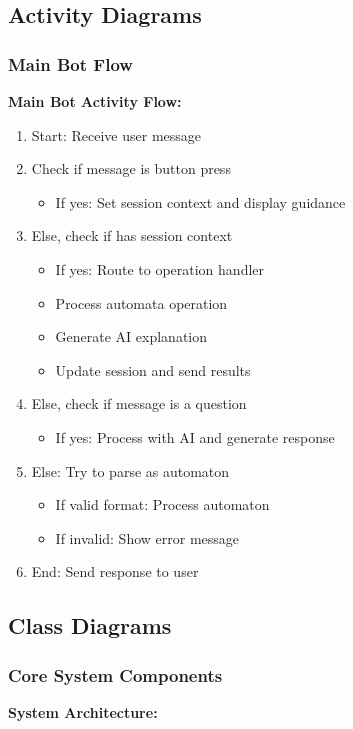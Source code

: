 \documentclass[12pt]{article}
\begin{document}
\subsection{Activity Diagrams}

\subsubsection{Main Bot Flow}
\textbf{Main Bot Activity Flow:}
\begin{enumerate}
    \item Start: Receive user message
    \item Check if message is button press
    \begin{itemize}
        \item If yes: Set session context and display guidance
    \end{itemize}
    \item Else, check if has session context
    \begin{itemize}
        \item If yes: Route to operation handler
        \item Process automata operation
        \item Generate AI explanation
        \item Update session and send results
    \end{itemize}
    \item Else, check if message is a question
    \begin{itemize}
        \item If yes: Process with AI and generate response
    \end{itemize}
    \item Else: Try to parse as automaton
    \begin{itemize}
        \item If valid format: Process automaton
        \item If invalid: Show error message
    \end{itemize}
    \item End: Send response to user
\end{enumerate}

\subsection{Class Diagrams}

\subsubsection{Core System Components}
\textbf{System Architecture:}
\end{document}
